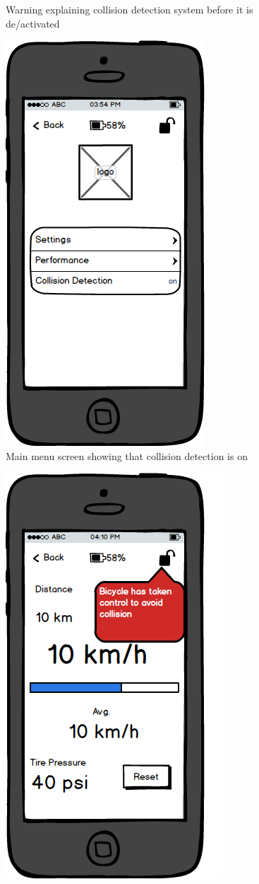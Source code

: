 \documentclass[a4paper]{report}
\begin{document}
{\begin{figure}
\caption{Warning explaining collision detection system before it is de/activated}
\end{figure}
\clearpage
\begin{figure}
\centering
\includegraphics[scale=0.9]{figures/prototype_1/collision_on}
\caption{Main menu screen showing that collision detection is on}
\end{figure}
\clearpage
\begin{figure}
\centering
\includegraphics[scale=0.8]{figures/prototype_1/control_alert_perf}

\end{figure}}
\end{document}
